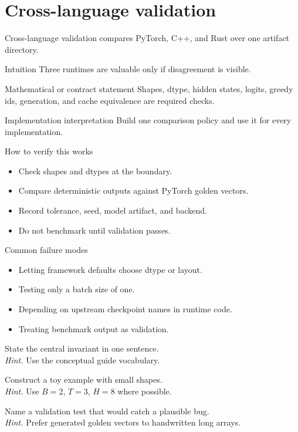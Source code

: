 \chapter{Cross-language validation}
\label{ch:cross-language}
Cross-language validation compares PyTorch, C++, and Rust over one artifact directory.



\begin{intuitionbox}{Intuition}
Three runtimes are valuable only if disagreement is visible.
\end{intuitionbox}

\begin{definitionbox}{Mathematical or contract statement}
Shapes, dtype, hidden states, logits, greedy ids, generation, and cache equivalence are required checks.
\end{definitionbox}

\begin{implementationbox}{Implementation interpretation}
Build one comparison policy and use it for every implementation.
\end{implementationbox}

\begin{verificationbox}{How to verify this works}
\begin{itemize}
\item Check shapes and dtypes at the boundary.
\item Compare deterministic outputs against PyTorch golden vectors.
\item Record tolerance, seed, model artifact, and backend.
\item Do not benchmark until validation passes.
\end{itemize}
\end{verificationbox}

\begin{warningbox}{Common failure modes}
\begin{itemize}
\item Letting framework defaults choose dtype or layout.
\item Testing only a batch size of one.
\item Depending on upstream checkpoint names in runtime code.
\item Treating benchmark output as validation.
\end{itemize}
\end{warningbox}

\begin{chapterexercises}
\item State the central invariant in one sentence.\\
\textit{Hint.} Use the conceptual guide vocabulary.
\item Construct a toy example with small shapes.\\
\textit{Hint.} Use $B=2$, $T=3$, $H=8$ where possible.
\item Name a validation test that would catch a plausible bug.\\
\textit{Hint.} Prefer generated golden vectors to handwritten long arrays.
\end{chapterexercises}

